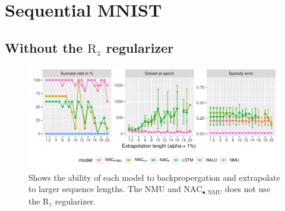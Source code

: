 \section{Sequential MNIST}

\subsection{Without the $\mathrm{R}_z$ regularizer}
\label{sec:appendix:sequential-mnist:ablation}
\begin{figure}[h]
\centering
\includegraphics[width=\linewidth,trim={0 0.5cm 0 0},clip]{results/sequential_mnist_prod_long_ablation.pdf}
\caption{Shows the ability of each model to backpropergation and extrapolate to larger sequence lengths. The NMU and $\mathrm{NAC}_{\bullet,\mathrm{NMU}}$ does not use the $\mathrm{R}_z$ regularizer.} 
\end{figure}
